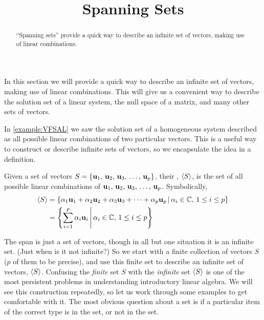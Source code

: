 \documentclass{ximera}
\title{Spanning Sets}
\begin{document}
\begin{abstract}
  ``Spanning sets'' provide a quick way to describe an infinite set of
  vectors, making use of linear combinations.
\end{abstract}
\maketitle

In this section we will provide a quick way to describe an infinite
set of vectors, making use of linear combinations.  This will give us
a convenient way to describe the solution set of a linear system, the
null space of a matrix, and many other sets of vectors.

In \ref{example:VFSAL} we saw the solution set of a homogeneous system
described as all possible linear combinations of two particular
vectors.  This is a useful way to construct or describe infinite sets
of vectors, so we encapsulate the idea in a definition.

\begin{definition}
  Given a set of vectors $S=\{\mathbf{u}_{1},\,\mathbf{u}_{2},\,\mathbf{u}_{3},\,\ldots,\,\mathbf{u}_{p}\}$, their ,
  $\left\langle S\right\rangle$, is the set of all possible linear combinations of
  $\mathbf{u}_{1},\,\mathbf{u}_{2},\,\mathbf{u}_{3},\,\ldots,\,\mathbf{u}_{p}$.  Symbolically,
  \begin{align*}
    \left\langle S\right\rangle&=\left\lbrace\alpha_{1}\mathbf{u}_{1}+\alpha_{2}\mathbf{u}_{2}+\alpha_{3}\mathbf{u}_{3}+\cdots +\alpha_{p}\mathbf{u}_{p}\,\middle|\,\alpha_i\in\mathbb{C},\,1\leq i\leq p\right\rbrace\\
           &=\left\lbrace\sum_{i=1}^{p}\alpha_i\mathbf{u}_i\,\middle|\,\alpha_i\in\mathbb{C},\,1\leq i\leq p\right\rbrace
  \end{align*}
\end{definition}

The span is just a set of vectors, though in all but one situation it
is an infinite set.  (Just when is it not infinite?)  So we start with
a finite collection of vectors $S$ ($p$ of them to be precise), and
use this finite set to describe an infinite set of vectors, $\left\langle S\right\rangle$.
Confusing the \textit{finite} set $S$ with the \textit{infinite} set
$\left\langle S\right\rangle$ is one of the most persistent problems in understanding
introductory linear algebra.  We will see this construction
repeatedly, so let us work through some examples to get comfortable
with it.  The most obvious question about a set is if a particular
item of the correct type is in the set, or not in the set.
\end{document}
